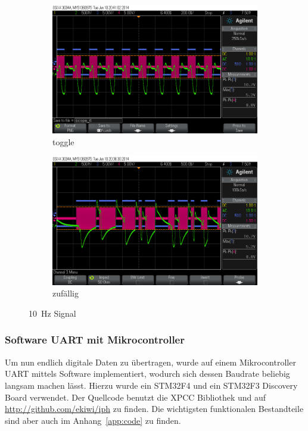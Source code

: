 \documentclass[12pt,a4paper]{article}
\begin{document}
\begin{figure}[H]
  \centering
  \begin{subfigure}[b]{0.6\textwidth}
    \includegraphics[width=\textwidth]{../measurements/20140610/10Hz_toggle/scope_6.png}
    \caption{toggle}
    \label{fig:uart_10hz_toggle}
  \end{subfigure}
  \begin{subfigure}[b]{0.6\textwidth}
    \includegraphics[width=\textwidth]{../measurements/20140610/10Hz_random/scope_4.png}
    \caption{zufällig}
    \label{fig:uart_10hz_random}
  \end{subfigure}
  \caption{\SI{10}{\hertz} Signal}
  \label{fig:uart_10hz}
\end{figure}

\subsubsection{Software UART mit Mikrocontroller}
Um nun endlich digitale Daten zu übertragen, wurde auf einem Mikrocontroller UART mittels Software implementiert, wodurch sich dessen Baudrate beliebig langsam machen lässt. Hierzu wurde ein STM32F4 und ein STM32F3 Discovery Board verwendet. Der Quellcode benutzt die XPCC Bibliothek und auf \url{http://github.com/ekiwi/iph} zu finden. Die wichtigsten funktionalen Bestandteile sind aber auch im Anhang~\ref{app:code} zu finden.
\end{document}
